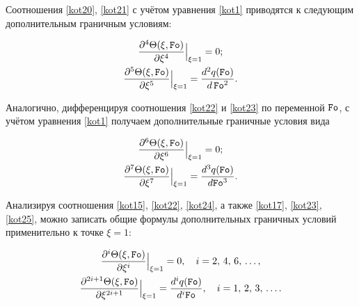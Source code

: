 Соотношения \eqref{kot20}, \eqref{kot21} с учётом уравнения \eqref{kot1} приводятся к следующим дополнительным граничным условиям:

\begin{gather}

\label{kot22}

\frac{\partial^4\Theta(\xi,\mbox{\tt Fo})}{\partial\xi^4}\Big|_{\xi=1}=0;

\\

\label{kot23}

\frac{\partial^5\Theta(\xi,\mbox{\tt Fo})}{\partial\xi^5} \Big|_{\xi=1}= 

\frac{d^2q(\mbox{\tt Fo})}{d\,\mbox{\tt Fo}^2}.

\end{gather}



Аналогично, дифференцируя соотношения \eqref{kot22} и \eqref{kot23} по переменной $\mbox{\tt Fo}$, с учётом уравнения \eqref{kot1} получаем дополнительные граничные условия вида

\begin{gather}

\label{kot24}

\frac{\partial^6\Theta(\xi,\mbox{\tt Fo})}{\partial\xi^6}\Big|_{\xi=1}=0;

\\

\label{kot25}

\frac{\partial^7\Theta(\xi,\mbox{\tt Fo})}{\partial\xi^7}\Big|_{\xi=1}=\frac{d^3q(\mbox{\tt Fo})}{d\mbox{\tt Fo}^3}.

\end{gather}



Анализируя соотношения \eqref{kot15}, \eqref{kot22}, \eqref{kot24}, а также \eqref{kot17}, \eqref{kot23}, \eqref{kot25}, можно записать общие формулы дополнительных граничных условий применительно к точке $\xi=1$:

\begin{gather}

\label{kot26}

\frac{\partial^i\Theta(\xi,\mbox{\tt Fo})}{\partial\xi^i}\Big|_{\xi=1}=0,\quad  i=2,\,4,\,6,\,\dots,

\\

\label{kot27}

\frac{\partial^{2i+1}\Theta(\xi,\mbox{\tt Fo})}{\partial\xi^{2i+1}}\Big|_{\xi=1}=\frac{d^iq(\mbox{\tt Fo})}{d^i\mbox{\tt Fo}},\quad  i=1,\,2,\,3,\,\dots.

\end{gather}



